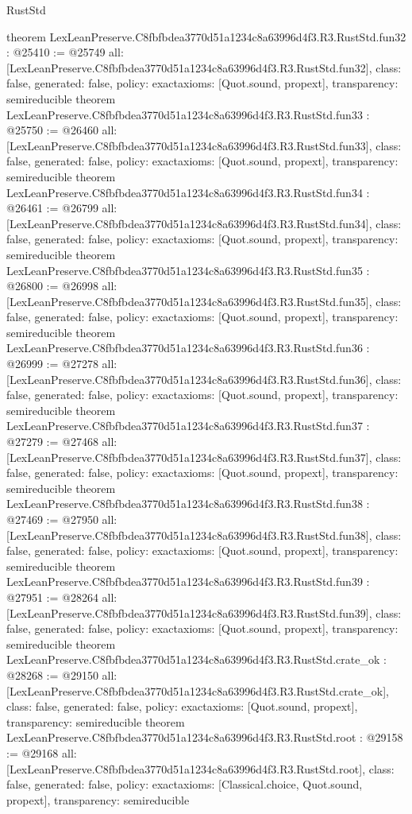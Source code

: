 \begin{lexlean}{RustStd}
\begin{coremodule}
{}
theorem LexLeanPreserve.C8fbfbdea3770d51a1234c8a63996d4f3.R3.RustStd.fun32 : @25410 := @25749 {
  all: [LexLeanPreserve.C8fbfbdea3770d51a1234c8a63996d4f3.R3.RustStd.fun32],
  class: false,
  generated: false,
  policy: exact{axioms: [Quot.sound, propext]},
  transparency: semireducible
}
theorem LexLeanPreserve.C8fbfbdea3770d51a1234c8a63996d4f3.R3.RustStd.fun33 : @25750 := @26460 {
  all: [LexLeanPreserve.C8fbfbdea3770d51a1234c8a63996d4f3.R3.RustStd.fun33],
  class: false,
  generated: false,
  policy: exact{axioms: [Quot.sound, propext]},
  transparency: semireducible
}
theorem LexLeanPreserve.C8fbfbdea3770d51a1234c8a63996d4f3.R3.RustStd.fun34 : @26461 := @26799 {
  all: [LexLeanPreserve.C8fbfbdea3770d51a1234c8a63996d4f3.R3.RustStd.fun34],
  class: false,
  generated: false,
  policy: exact{axioms: [Quot.sound, propext]},
  transparency: semireducible
}
theorem LexLeanPreserve.C8fbfbdea3770d51a1234c8a63996d4f3.R3.RustStd.fun35 : @26800 := @26998 {
  all: [LexLeanPreserve.C8fbfbdea3770d51a1234c8a63996d4f3.R3.RustStd.fun35],
  class: false,
  generated: false,
  policy: exact{axioms: [Quot.sound, propext]},
  transparency: semireducible
}
theorem LexLeanPreserve.C8fbfbdea3770d51a1234c8a63996d4f3.R3.RustStd.fun36 : @26999 := @27278 {
  all: [LexLeanPreserve.C8fbfbdea3770d51a1234c8a63996d4f3.R3.RustStd.fun36],
  class: false,
  generated: false,
  policy: exact{axioms: [Quot.sound, propext]},
  transparency: semireducible
}
theorem LexLeanPreserve.C8fbfbdea3770d51a1234c8a63996d4f3.R3.RustStd.fun37 : @27279 := @27468 {
  all: [LexLeanPreserve.C8fbfbdea3770d51a1234c8a63996d4f3.R3.RustStd.fun37],
  class: false,
  generated: false,
  policy: exact{axioms: [Quot.sound, propext]},
  transparency: semireducible
}
theorem LexLeanPreserve.C8fbfbdea3770d51a1234c8a63996d4f3.R3.RustStd.fun38 : @27469 := @27950 {
  all: [LexLeanPreserve.C8fbfbdea3770d51a1234c8a63996d4f3.R3.RustStd.fun38],
  class: false,
  generated: false,
  policy: exact{axioms: [Quot.sound, propext]},
  transparency: semireducible
}
theorem LexLeanPreserve.C8fbfbdea3770d51a1234c8a63996d4f3.R3.RustStd.fun39 : @27951 := @28264 {
  all: [LexLeanPreserve.C8fbfbdea3770d51a1234c8a63996d4f3.R3.RustStd.fun39],
  class: false,
  generated: false,
  policy: exact{axioms: [Quot.sound, propext]},
  transparency: semireducible
}
theorem LexLeanPreserve.C8fbfbdea3770d51a1234c8a63996d4f3.R3.RustStd.crate_ok : @28268 := @29150 {
  all: [LexLeanPreserve.C8fbfbdea3770d51a1234c8a63996d4f3.R3.RustStd.crate_ok],
  class: false,
  generated: false,
  policy: exact{axioms: [Quot.sound, propext]},
  transparency: semireducible
}
theorem LexLeanPreserve.C8fbfbdea3770d51a1234c8a63996d4f3.R3.RustStd.root : @29158 := @29168 {
  all: [LexLeanPreserve.C8fbfbdea3770d51a1234c8a63996d4f3.R3.RustStd.root],
  class: false,
  generated: false,
  policy: exact{axioms: [Classical.choice, Quot.sound, propext]},
  transparency: semireducible
}


\end{coremodule}
\end{lexlean}
